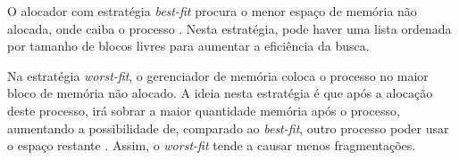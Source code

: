
O alocador com estratégia \textsl{best-fit} procura o menor espaço de memória
não alocada, onde caiba o processo \cite{BowieMemoryAllocation}. Nesta
estratégia, pode haver uma lista ordenada por tamanho de blocos livres para aumentar
a eficiência da busca.

Na estratégia \textsl{worst-fit}, o gerenciador de memória coloca o processo
no maior bloco de memória não alocado.  A ideia nesta estratégia é que após
a alocação deste processo, irá sobrar a maior quantidade memória após o
processo, aumentando a possibilidade de, comparado ao \textsl{best-fit}, 
outro processo poder usar o espaço restante \cite{BowieMemoryAllocation}.
Assim, o \textsl{worst-fit} tende a causar menos fragmentações.

